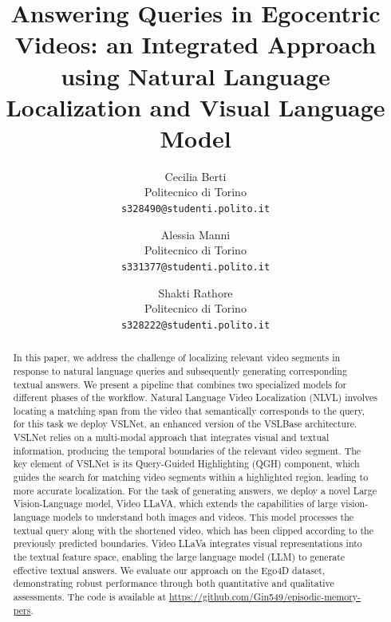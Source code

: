 \documentclass[10pt,twocolumn,letterpaper]{article}
\begin{document}
\title{Answering Queries in Egocentric Videos: an Integrated Approach using Natural Language Localization and Visual Language Model}

\author{Cecilia Berti\\
Politecnico di Torino\\
{\tt\small s328490@studenti.polito.it}
\and
Alessia Manni\\
Politecnico di Torino\\
{\tt\small s331377@studenti.polito.it}
\and
Shakti Rathore\\
Politecnico di Torino\\
{\tt\small s328222@studenti.polito.it}
}

\maketitle

\begin{abstract}
In this paper, we address the challenge of localizing relevant video segments in response to natural language queries and subsequently generating corresponding textual answers.  We present a pipeline that combines two specialized models for different phases of the workflow. Natural Language Video Localization (NLVL) involves locating a matching span from the video that semantically corresponds to the query, for this task we deploy VSLNet, an enhanced version of the VSLBase architecture. VSLNet relies on a multi-modal approach that integrates visual and textual information, producing the temporal boundaries of the relevant video segment. The key element of VSLNet is its Query-Guided Highlighting (QGH) component, which guides the search for matching video segments within a highlighted region, leading to more accurate localization. For the task of generating answers, we deploy a novel Large Vision-Language model, Video LLaVA, which extends the capabilities of large vision-language models to understand both images and videos. This model processes the textual query along with the shortened video, which has been clipped according to the previously predicted boundaries. Video LLaVa integrates visual representations into the textual feature space, enabling the large language model (LLM) to generate effective textual answers. We evaluate our approach on the Ego4D dataset, demonstrating robust performance through both quantitative and qualitative assessments. The code is available at \href{https://github.com/Gin549/episodic-memory-pers}{https://github.com/Gin549/episodic-memory-pers}.
\end{abstract}
\end{document}
